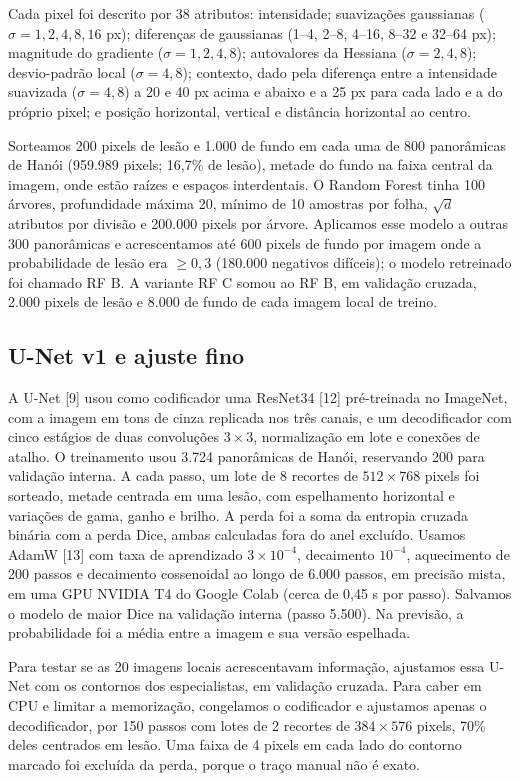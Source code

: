 \documentclass[twocolumn]{article}
\begin{document}
Cada pixel foi descrito por 38 atributos: intensidade; suavizações gaussianas ($\sigma = 1, 2, 4, 8, 16$ px); diferenças de gaussianas (1--4, 2--8, 4--16, 8--32 e 32--64 px); magnitude do gradiente ($\sigma = 1, 2, 4, 8$); autovalores da Hessiana ($\sigma = 2, 4, 8$); desvio-padrão local ($\sigma = 4, 8$); contexto, dado pela diferença entre a intensidade suavizada ($\sigma = 4, 8$) a 20 e 40 px acima e abaixo e a 25 px para cada lado e a do próprio pixel; e posição horizontal, vertical e distância horizontal ao centro.

Sorteamos 200 pixels de lesão e 1.000 de fundo em cada uma de 800 panorâmicas de Hanói (959.989 pixels; 16,7\% de lesão), metade do fundo na faixa central da imagem, onde estão raízes e espaços interdentais. O Random Forest tinha 100 árvores, profundidade máxima 20, mínimo de 10 amostras por folha, $\sqrt{d}$ atributos por divisão e 200.000 pixels por árvore. Aplicamos esse modelo a outras 300 panorâmicas e acrescentamos até 600 pixels de fundo por imagem onde a probabilidade de lesão era $\geq 0{,}3$ (180.000 negativos difíceis); o modelo retreinado foi chamado RF B. A variante RF C somou ao RF B, em validação cruzada, 2.000 pixels de lesão e 8.000 de fundo de cada imagem local de treino.

\subsection{U-Net v1 e ajuste fino}

A U-Net [9] usou como codificador uma ResNet34 [12] pré-treinada no ImageNet, com a imagem em tons de cinza replicada nos três canais, e um decodificador com cinco estágios de duas convoluções $3 \times 3$, normalização em lote e conexões de atalho. O treinamento usou 3.724 panorâmicas de Hanói, reservando 200 para validação interna. A cada passo, um lote de 8 recortes de $512 \times 768$ pixels foi sorteado, metade centrada em uma lesão, com espelhamento horizontal e variações de gama, ganho e brilho. A perda foi a soma da entropia cruzada binária com a perda Dice, ambas calculadas fora do anel excluído. Usamos AdamW [13] com taxa de aprendizado $3 \times 10^{-4}$, decaimento $10^{-4}$, aquecimento de 200 passos e decaimento cossenoidal ao longo de 6.000 passos, em precisão mista, em uma GPU NVIDIA T4 do Google Colab (cerca de 0,45 s por passo). Salvamos o modelo de maior Dice na validação interna (passo 5.500). Na previsão, a probabilidade foi a média entre a imagem e sua versão espelhada.

Para testar se as 20 imagens locais acrescentavam informação, ajustamos essa U-Net com os contornos dos especialistas, em validação cruzada. Para caber em CPU e limitar a memorização, congelamos o codificador e ajustamos apenas o decodificador, por 150 passos com lotes de 2 recortes de $384 \times 576$ pixels, 70\% deles centrados em lesão. Uma faixa de 4 pixels em cada lado do contorno marcado foi excluída da perda, porque o traço manual não é exato.
\end{document}
